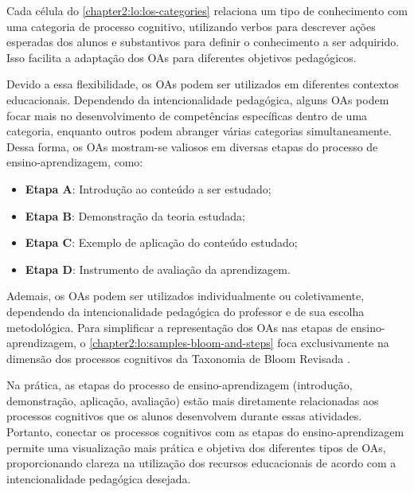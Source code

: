 Cada célula do \autoref{chapter2:lo:los-categories} relaciona um tipo de conhecimento com uma categoria de processo cognitivo, utilizando verbos para descrever ações esperadas dos alunos e substantivos para definir o conhecimento a ser adquirido. Isso facilita a adaptação dos OAs para diferentes objetivos pedagógicos.

Devido a essa flexibilidade, os OAs podem ser utilizados em diferentes contextos educacionais. Dependendo da intencionalidade pedagógica, alguns OAs podem focar mais no desenvolvimento de competências específicas dentro de uma categoria, enquanto outros podem abranger várias categorias simultaneamente. Dessa forma, os OAs mostram-se valiosos em diversas etapas do processo de ensino-aprendizagem, como:

\begin{itemize}
\item \textbf{Etapa A}: Introdução ao conteúdo a ser estudado;
\item \textbf{Etapa B}: Demonstração da teoria estudada;
\item \textbf{Etapa C}: Exemplo de aplicação do conteúdo estudado;
\item \textbf{Etapa D}: Instrumento de avaliação da aprendizagem.
\end{itemize}

Ademais, os OAs podem ser utilizados individualmente ou coletivamente, dependendo da intencionalidade pedagógica do professor e de sua escolha metodológica. Para simplificar a representação dos OAs nas etapas de ensino-aprendizagem, o \autoref{chapter2:lo:samples-bloom-and-steps} foca exclusivamente na dimensão dos processos cognitivos da Taxonomia de Bloom Revisada \cite{Krathwohl2002}. 

Na prática, as etapas do processo de ensino-aprendizagem (introdução, demonstração, aplicação, avaliação) estão mais diretamente relacionadas aos processos cognitivos que os alunos desenvolvem durante essas atividades. Portanto, conectar os processos cognitivos com as etapas do ensino-aprendizagem permite uma visualização mais prática e objetiva dos diferentes tipos de OAs, proporcionando clareza na utilização dos recursos educacionais de acordo com a intencionalidade pedagógica desejada.

